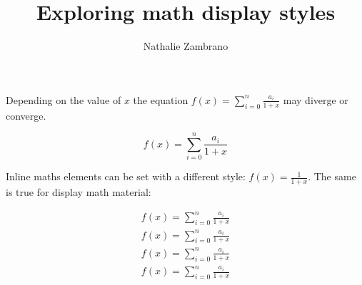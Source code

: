 \documentclass{article}
\title{Exploring math display styles}
\author{Nathalie Zambrano}
\begin{document}
\maketitle

Depending on the value of \(x\) the equation \( f(x) = \sum_{i=0}^{n} \frac{a_i}{1+x} \) may diverge or converge.

\[ f(x) = \sum_{i=0}^{n} \frac{a_i}{1+x} \]

\vspace{1cm}

Inline maths elements can be set with a different style: \(f(x) = \displaystyle \frac{1}{1+x}\). The same is true for display math material:

\begin{align*}
    f(x) = \sum_{i=0}^{n} \frac{a_i}{1+x}              \\
    \textstyle f(x) = \sum_{i=0}^{n} \frac{a_i}{1+x}   \\
    \scriptstyle f(x) = \sum_{i=0}^{n} \frac{a_i}{1+x} \\
    \scriptscriptstyle f(x) = \sum_{i=0}^{n} \frac{a_i}{1+x}
\end{align*}
\end{document}

